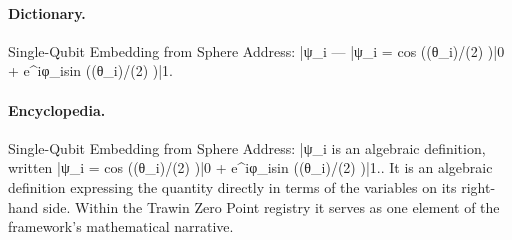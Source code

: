 \paragraph{Dictionary.}
Single-Qubit Embedding from Sphere Address: |ψ\_i — |ψ\_i = cos ((θ\_i)/(2) )|0 + e\textasciicircum{}iφ\_isin ((θ\_i)/(2) )|1.

\paragraph{Encyclopedia.}
Single-Qubit Embedding from Sphere Address: |ψ\_i is an algebraic definition, written |ψ\_i = cos ((θ\_i)/(2) )|0 + e\textasciicircum{}iφ\_isin ((θ\_i)/(2) )|1.. It is an algebraic definition expressing the quantity directly in terms of the variables on its right-hand side. Within the Trawin Zero Point registry it serves as one element of the framework's mathematical narrative.
